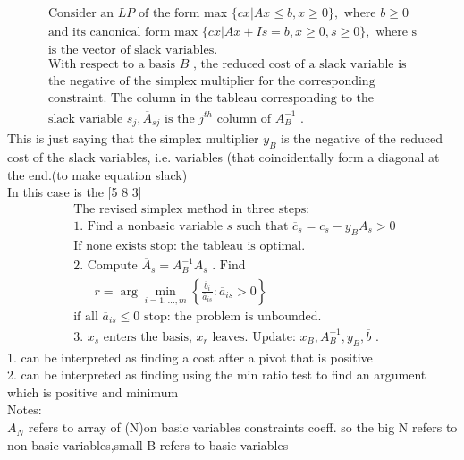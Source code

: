 \documentclass{article}
\begin{document}
$$
\begin{array} { l } { \text { Consider an } L P \text { of the form max } \{ c x | A x \leqslant b , x \geqslant 0 \} , \text { where } b \geqslant 0 } \\ { \text { and its canonical form max } \{ c x | A x + I s = b , x \geqslant 0 , s \geq 0 \} , \text { where s } } \\ { \text { is the vector of slack variables. } } \\ { \text { With respect to a basis } B \text { , the reduced cost of a slack variable is } } \\ { \text { the negative of the simplex multiplier for the corresponding } } \\ { \text { constraint. The column in the tableau corresponding to the } } \\ { \text { slack variable } s _ { j } , \overline { A } _ { s j } \text { is the } j ^ { t h } \text { column of } A _ { B } ^ { - 1 } \text { . } } \end{array}
$$
This is just saying that the simplex multiplier $y_B$ is the negative of the reduced cost of the slack variables, i.e. variables (that coincidentally form a diagonal at the end.(to make equation slack)\\
In this case is the [5 8 3]\\
$$
\begin{array} { l } { \text { The revised simplex method in three steps: } } \\ { \text { 1. Find a nonbasic variable } s \text { such that } \overline { c } _ { s } = c _ { s } - y _ { B } A _ { s } > 0 } \\ { \text { If none exists stop: the tableau is optimal. } } \\ { \text { 2. Compute } \overline { A } _ { s } = A _ { B } ^ { - 1 } A _ { s } \text { . Find } } \\ { \qquad r = \arg \min _ { i = 1 , \ldots , m } \left\{ \frac { \overline { b } _ { i } } { \overline { a } _ { i s } } : \overline { a } _ { i s } > 0 \right\} } \\ { \text { if all } \overline { a } _ { i s } \leqslant 0 \text { stop: the problem is unbounded. } } \\ { \text { 3. } x _ { s } \text { enters the basis, } x _ { r } \text { leaves. Update: } x _ { B } , A _ { B } ^ { - 1 } , y _ { B } , \overline { b } \text { . } } \end{array}
$$
1. can be interpreted as finding a cost after a pivot that is positive\\
2. can be interpreted as finding using the min ratio test to find an argument which is positive and minimum\\
Notes:\\
$A_N$ refers to array of (N)on basic variables constraints coeff.
so the big N refers to non basic variables,small B refers to basic variables
\end{document}
